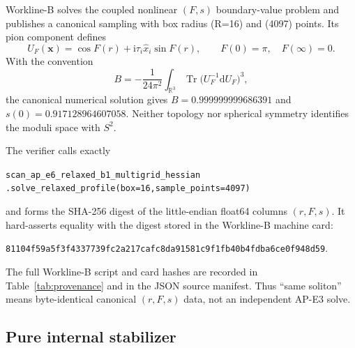 \documentclass[11pt]{article}
\theoremstyle{definition}
\theoremstyle{remark}
\newcommand{\ii}{\mathrm i}
\newcommand{\dd}{\mathrm d}
\newcommand{\RR}{\mathbb R}
\newcommand{\Tr}{\operatorname{Tr}}
\begin{document}
Workline-B solves the coupled nonlinear \((F,s)\) boundary-value problem and
publishes a canonical sampling with box radius (R=16) and (4097) points.
Its pion component defines
\begin{equation}
 U_F(\bm x)=\cos F(r)+\ii\tau_i\widehat x_i\sin F(r),
 \qquad F(0)=\pi,\quad F(\infty)=0.
 \label{eq:hedgehog}
\end{equation}
With the convention
\begin{equation}
 B=-\frac{1}{24\pi^2}\int_{\RR^3}
 \Tr\bigl(U_F^{-1}\dd U_F\bigr)^3,
 \label{eq:baryon}
\end{equation}
the canonical numerical solution gives
\(B=0.999999999686391\) and
\(s(0)=0.917128964607058\).  Neither topology nor spherical symmetry
identifies the moduli space with \(S^2\).

The verifier calls exactly
\begin{center}
\small
\nolinkurl{scan_ap_e6_relaxed_b1_multigrid_hessian}\\[-1pt]
\nolinkurl{.solve_relaxed_profile(box=16,sample_points=4097)}
\end{center}
and forms the SHA-256 digest of the little-endian float64 columns
\((r,F,s)\).  It hard-asserts equality with the digest stored in the
Workline-B machine card:
\begin{center}
\small\nolinkurl{81104f59a5f3f4337739fc2a217cafc8da91581c9f1fb40b4fdba6ce0f948d59}.
\end{center}
The full Workline-B script and card hashes are recorded in
Table~\ref{tab:provenance} and in the JSON source manifest.  Thus
``same soliton'' means byte-identical canonical \((r,F,s)\) data, not an
independent AP-E3 solve.

\subsection{Pure internal stabilizer}
\end{document}
